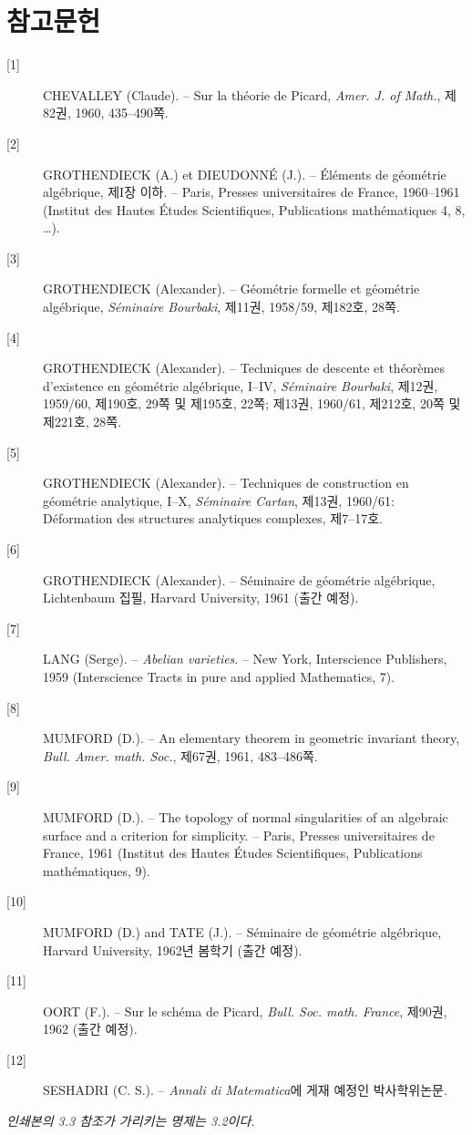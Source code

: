 \section*{참고문헌}

\begin{description}
\item[{[1]}] CHEVALLEY (Claude). -- Sur la théorie de Picard,
\emph{Amer. J. of Math.}, 제82권, 1960, 435--490쪽.

\item[{[2]}] GROTHENDIECK (A.) et DIEUDONNÉ (J.). -- Éléments de géométrie
algébrique, 제I장 이하. -- Paris, Presses universitaires de France,
1960--1961 (Institut des Hautes Études Scientifiques, Publications
mathématiques 4, 8, \ldots).

\item[{[3]}] GROTHENDIECK (Alexander). -- Géométrie formelle et géométrie
algébrique, \emph{Séminaire Bourbaki}, 제11권, 1958/59,
제182호, 28쪽.

\item[{[4]}] GROTHENDIECK (Alexander). -- Techniques de descente et théorèmes
d'existence en géométrie algébrique, I--IV, \emph{Séminaire Bourbaki}, 제12권,
1959/60, 제190호, 29쪽 및 제195호, 22쪽; 제13권, 1960/61, 제212호, 20쪽 및
제221호, 28쪽.

\item[{[5]}] GROTHENDIECK (Alexander). -- Techniques de construction en
géométrie analytique, I--X, \emph{Séminaire Cartan}, 제13권, 1960/61:
Déformation des structures analytiques complexes, 제7--17호.

\item[{[6]}] GROTHENDIECK (Alexander). -- Séminaire de géométrie algébrique,
Lichtenbaum 집필, Harvard University, 1961 (출간 예정).

\item[{[7]}] LANG (Serge). -- \emph{Abelian varieties}. -- New York,
Interscience Publishers, 1959 (Interscience Tracts in pure and applied
Mathematics, 7).

\item[{[8]}] MUMFORD (D.). -- An elementary theorem in geometric invariant
theory, \emph{Bull. Amer. math. Soc.}, 제67권, 1961, 483--486쪽.

\item[{[9]}] MUMFORD (D.). -- The topology of normal singularities of an
algebraic surface and a criterion for simplicity. -- Paris, Presses
universitaires de France, 1961 (Institut des Hautes Études Scientifiques,
Publications mathématiques, 9).

\item[{[10]}] MUMFORD (D.) and TATE (J.). -- Séminaire de géométrie
algébrique, Harvard University, 1962년 봄학기 (출간 예정).

\item[{[11]}] OORT (F.). -- Sur le schéma de Picard,
\emph{Bull. Soc. math. France}, 제90권, 1962 (출간 예정).

\item[{[12]}] SESHADRI (C. S.). -- \emph{Annali di Matematica}에 게재 예정인
박사학위논문.
\end{description}

\par\smallskip
\begingroup\footnotesize
\noindent\textit{인쇄본의 3.3 참조가 가리키는 명제는 3.2이다.}\par
\endgroup
